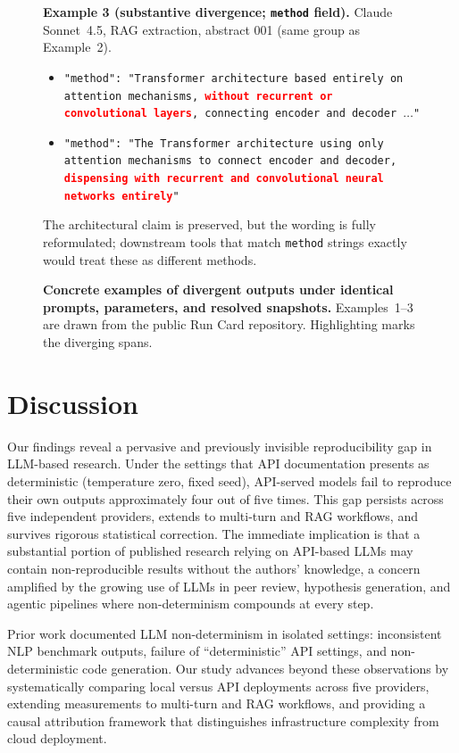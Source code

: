 \documentclass[sn-nature]{sn-jnl}
\begin{document}
\begin{figure}[t]
{\begin{minipage}{0.94\textwidth}
\medskip
\noindent\textbf{Example 3 (substantive divergence; \texttt{method} field).}
Claude Sonnet~4.5, RAG extraction, abstract 001 (same group as Example~2).
\begin{itemize}
\item[Run~A:] \texttt{"method": "Transformer architecture based entirely on attention mechanisms, \textcolor{red}{\textbf{without recurrent or convolutional layers}}, connecting encoder and decoder $\ldots$"}
\item[Run~B:] \texttt{"method": "The Transformer architecture using only attention mechanisms to connect encoder and decoder, \textcolor{red}{\textbf{dispensing with recurrent and convolutional neural networks entirely}}"}
\end{itemize}
The architectural claim is preserved, but the wording is fully reformulated; downstream tools that match \texttt{method} strings exactly would treat these as different methods.
\end{minipage}}
\caption{\textbf{Concrete examples of divergent outputs under identical prompts, parameters, and resolved snapshots.}
Examples~1--3 are drawn from the public Run Card repository.
Highlighting marks the diverging spans.}\label{box:examples}
\end{figure}


\section{Discussion}\label{sec:discussion}

Our findings reveal a pervasive and previously invisible reproducibility gap in LLM-based research.
Under the settings that API documentation presents as deterministic (temperature zero, fixed seed), API-served models fail to reproduce their own outputs approximately four out of five times.
This gap persists across five independent providers, extends to multi-turn and RAG workflows, and survives rigorous statistical correction.
The immediate implication is that a substantial portion of published research relying on API-based LLMs may contain non-reproducible results without the authors' knowledge, a concern amplified by the growing use of LLMs in peer review\cite{thakkar2026llm}, hypothesis generation\cite{xin2025agentic}, and agentic pipelines where non-determinism compounds at every step.

Prior work documented LLM non-determinism in isolated settings: inconsistent NLP benchmark outputs\cite{chen2023chatgpt}, failure of ``deterministic'' API settings\cite{atil2024nondeterminism}, and non-deterministic code generation\cite{ouyang2024nondeterminism}.
Our study advances beyond these observations by systematically comparing local versus API deployments across five providers, extending measurements to multi-turn and RAG workflows, and providing a causal attribution framework that distinguishes infrastructure complexity from cloud deployment.
\end{document}
